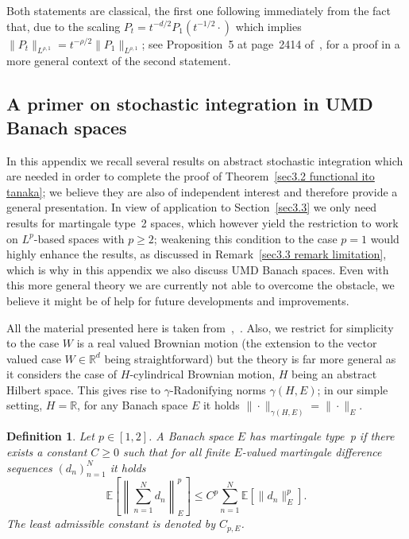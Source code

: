 \documentclass[10pt]{article}
\newtheorem{definition}{Definition}
\begin{document}
Both statements are classical, the first one following immediately from the
fact that, due to the scaling $P_t = t^{- d / 2} P_1 (t^{- 1 / 2} \cdot)$
which implies $\| P_t \|_{L^{\rho, 1}} = t^{- \rho / 2} \| P_1 \|_{L^{\rho,
1}}$; see Proposition~5 at page~2414 of~{\cite{mourratweber}}, for a proof in
a more general context of the second statement.

\subsection{A primer on stochastic integration in UMD Banach
spaces}\label{appendixA3}

In this appendix we recall several results on abstract stochastic integration
which are needed in order to complete the proof of Theorem~\ref{sec3.2
functional ito tanaka}; we believe they are also of independent interest and
therefore provide a general presentation. In view of application to
Section~\ref{sec3.3} we only need results for martingale type~2 spaces, which
however yield the restriction to work on $L^p$-based spaces with $p \geqslant
2$; weakening this condition to the case $p = 1$ would highly enhance the
results, as discussed in Remark~\ref{sec3.3 remark limitation}, which is why
in this appendix we also discuss UMD Banach spaces. Even with this more
general theory we are currently not able to overcome the obstacle, we believe
it might be of help for future developments and improvements.



All the material presented here is taken
from~{\cite{vanneerven2007}},~{\cite{vanneerven2015}}. Also, we restrict for
simplicity to the case $W$ is a real valued Brownian motion (the extension to
the vector valued case $W \in \mathbb{R}^d$ being straightforward) but the
theory is far more general as it considers the case of $H$\mbox{-}cylindrical
Brownian motion, $H$ being an abstract Hilbert space. This gives rise to
$\gamma$\mbox{-}Radonifying norms $\gamma (H, E)$; in our simple setting, $H
=\mathbb{R}$, for any Banach space $E$ it holds $\| \cdot \|_{\gamma (H, E)} =
\| \cdot \|_E$.

\begin{definition}
  \label{appendixA3 defn martingale type}Let $p \in [1, 2]$. A Banach space
  $E$ has martingale type~p if there exists a constant $C \geqslant 0$ such
  that for all finite $E$\mbox{-}valued martingale difference sequences
  $(d_n)_{n = 1}^N$ it holds
  \[ \mathbb{E} \left[ \left\| \sum^N_{n = 1} d_n \right\|_E^p \right]
     \leqslant C^p \sum_{n = 1}^N \mathbb{E} [\| d_n \|_E^p] . \]
  The least admissible constant is denoted by $C_{p, E}$.
\end{definition}
\end{document}
